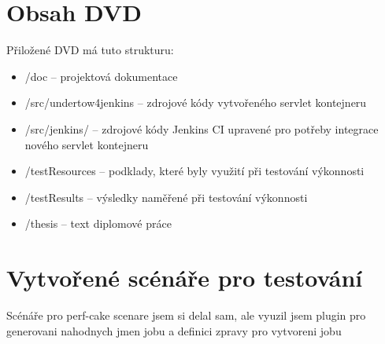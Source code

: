 
\chapter{Obsah DVD}
    Přiložené DVD má tuto strukturu:
    \begin{itemize}
        \item /doc -- projektová dokumentace
        \item /src/undertow4jenkins -- zdrojové kódy vytvořeného servlet kontejneru
        \item /src/jenkins/ -- zdrojové kódy Jenkins CI upravené pro potřeby integrace nového servlet kontejneru
        \item /testResources -- podklady, které byly využití při testování výkonnosti
        \item /testResults -- výsledky naměřené při testování výkonnosti
        \item /thesis -- text diplomové práce
    \end{itemize}

\chapter{Vytvořené scénáře pro testování} \label{prilohaScenare}
    Scénáře pro perf-cake
    scenare jsem si delal sam, ale vyuzil jsem plugin pro generovani nahodnych jmen jobu a definici zpravy pro vytvoreni jobu



